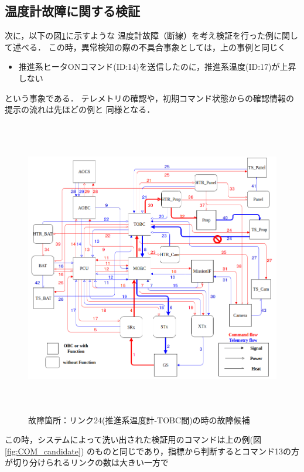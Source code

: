 \documentclass[11pt]{jsreport}
\begin{document}

\subsection{温度計故障に関する検証}%
次に，以下の図\ref{fig:fault_mode2}に示すような
温度計故障（断線）を考え検証を行った例に関して述べる．
この時，異常検知の際の不具合事象としては，上の事例と同じく
\begin{itemize}
   \item 推進系ヒータONコマンド(ID:14)を送信したのに，推進系温度(ID:17)が上昇しない
\end{itemize}
という事象である．
テレメトリの確認や，初期コマンド状態からの確認情報の提示の流れは先ほどの例と
同様となる．
\begin{figure}[H]
   \centering
      \includegraphics[height=13.0cm]{figure/fault_mode2.png}
      \caption{故障箇所：リンク24(推進系温度計-TOBC間)の時の故障候補}
      \label{fig:fault_mode2}
\end{figure}
この時，システムによって洗い出された検証用のコマンドは上の例(図\ref{fig:COM_candidate})
のものと同じであり，指標から判断するとコマンド13の方が切り分けられるリンクの数は大きい一方で
\end{document}
